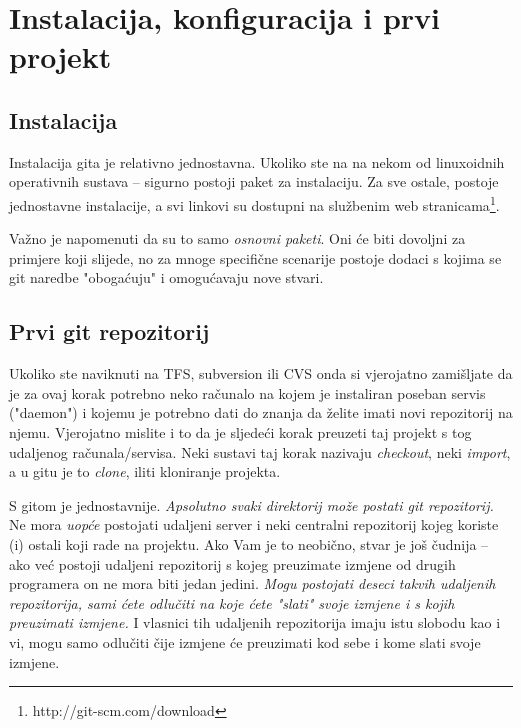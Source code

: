 \chapter*{Instalacija, konfiguracija i prvi projekt}

\section*{Instalacija}

Instalacija gita je relativno jednostavna. Ukoliko ste na na nekom od linuxoidnih operativnih sustava -- sigurno postoji paket za instalaciju. 
Za sve ostale, postoje jednostavne instalacije, a svi linkovi su dostupni na službenim web stranicama\footnote{http://git-scm.com/download}.

Važno je napomenuti da su to samo \emph{osnovni paketi}. 
Oni će biti dovoljni za primjere koji slijede, no za mnoge specifične scenarije postoje dodaci s kojima se git naredbe "obogaćuju" i omogućavaju nove stvari.

\section*{Prvi git repozitorij}

Ukoliko ste naviknuti na TFS, subversion ili CVS onda si vjerojatno zamišljate da je za ovaj korak potrebno neko računalo na kojem je instaliran poseban servis ("daemon") i kojemu je potrebno dati do znanja da želite imati novi repozitorij na njemu.
Vjerojatno mislite i to da je sljedeći korak preuzeti taj projekt s tog udaljenog računala/servisa.
Neki sustavi taj korak nazivaju \emph{checkout}, neki \emph{import}, a u gitu je to \emph{clone}, iliti kloniranje projekta.

S gitom je jednostavnije. 
\emph{Apsolutno svaki direktorij može postati git repozitorij.}
Ne mora \emph{uopće} postojati udaljeni server i neki centralni repozitorij kojeg koriste (i) ostali koji rade na projektu.
Ako Vam je to neobično, stvar je još čudnija -- ako već postoji udaljeni repozitorij s kojeg preuzimate izmjene od drugih programera on ne mora biti jedan jedini.
\emph{Mogu postojati deseci takvih udaljenih repozitorija, sami ćete odlučiti na koje ćete "slati" svoje izmjene i s kojih preuzimati izmjene.}
I vlasnici tih udaljenih repozitorija imaju istu slobodu kao i vi, mogu samo odlučiti čije izmjene će preuzimati kod sebe i kome slati svoje izmjene.

